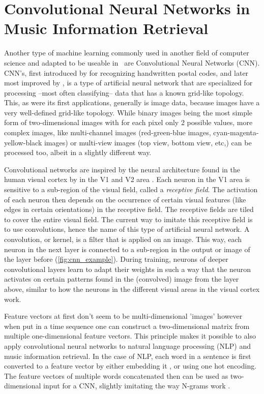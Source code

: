 \section[CNN in MIR]{Convolutional Neural Networks in Music Information Retrieval}
\label{sec:cnn_related}
Another type of machine learning commonly used in another field of computer science and adapted to be useable in \mir\ are Convolutional Neural Networks (CNN). CNN's, first introduced by \textcite{Lecun1989backpropagation} for recognizing handwritten postal codes, and later most improved by \textcite{Krizhevsky2012imagenet}, is a type of artificial neural network that are specialized for processing --most often classifying-- data that has a known grid-like topology. This, as were its first applications, generally is image data, because images have a very well-defined grid-like topology. While binary images being the most simple form of two-dimensional images with for each pixel only 2 possible values, more complex images, like multi-channel images (red-green-blue images, cyan-magenta-yellow-black images) or multi-view images (top view, bottom view, etc,) can be processed too, albeit in a slightly different way.

Convolutional networks are inspired by the neural architecture found in the human visual cortex by \textcite{Hubel1968receptive} in the V1 and V2 area \cite{Lindsay2020convolutional}. Each neuron in the V1 area is sensitive to a sub-region of the visual field, called a \textit{receptive field}. The activation of each neuron then depends on the occurrence of certain visual features (like edges in certain orientations) in the receptive field. The receptive fields are tiled to cover the entire visual field. The current way to imitate this receptive field is to use convolutions, hence the name of this type of artificial neural network. A convolution, or kernel, is a filter that is applied on an image. This way, each neuron in the next layer is connected to a sub-region in the output or image of the layer before (\autoref{fig:cnn_example}). During training, neurons of deeper convolutional layers learn to adapt their weights in such a way that the neuron activates on certain patterns found in the (convolved) image from the layer above, similar to how the neurons in the different visual areas in the visual cortex work.

Feature vectors at first don't seem to be multi-dimensional 'images' however when put in a time sequence one can construct a two-dimensional matrix from multiple one-dimensional feature vectors. This principle makes it possible to also apply convolutional neural networks to natural language processing (NLP) \cite{Lopez2017deep} and music information retrieval. In the case of NLP, each word in a sentence is first converted to a feature vector by either embedding it \cite{Ghannay2016word,Mikolov2013efficient}, or using one hot encoding. The feature vectors of multiple words concatenated then can be used as two-dimensional input for a CNN, slightly imitating the way N-grams work \cite{Brown1992class}.

